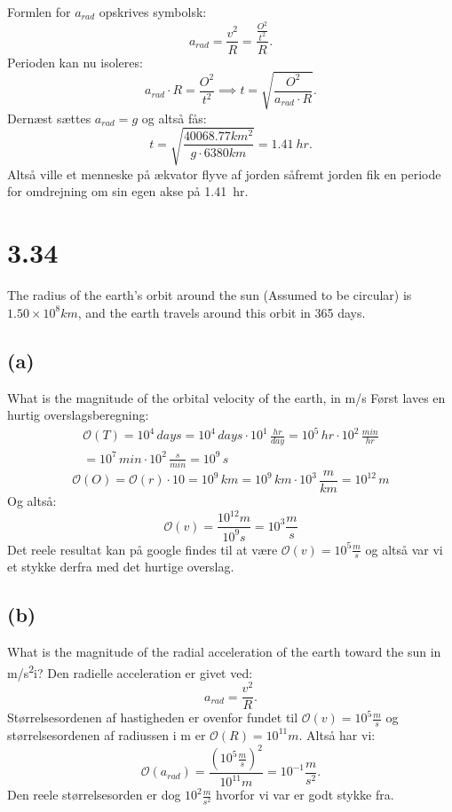 \documentclass[12pt]{article}
\begin{document}
\bigbreak
Formlen for $a_{rad}$ opskrives symbolsk:
\[
	a_{rad} = \frac{v^2}{R} = \frac{\frac{O^2}{t^2}}{R}
.\] 
Perioden kan nu isoleres:
\[
a_{rad}\cdot R = \frac{O^2}{t^2} \implies t = \sqrt{\frac{O^2}{a_{rad}\cdot R}} 
.\] 
Dernæst sættes $a_{rad} = g$ og altså fås:
\[
t = \sqrt{\frac{40068.77 km ^2}{g\cdot 6380 km}} = \qty{1,41}{hr}
.\] 
Altså ville et menneske på ækvator flyve af jorden såfremt jorden fik en periode for omdrejning om sin egen akse på \qty{1,41}{hr}.


\section*{3.34}
	The radius of the earth's orbit around the sun (Assumed to be circular) is $1.50 \times 10^8 \si{ km}$, and the earth travels around this orbit in 365 days.

	\subsection*{(a)}
	What is the magnitude of the orbital velocity of the earth, in \si{m/s}
	\bigbreak
	Først laves en hurtig overslagsberegning:
	\begin{gather*}
		\mathcal{O}(T) = 10^4 \,days = 10^4 \,days \cdot 10^1 \,\frac{hr}{day} =  10^5 \,hr \cdot 10^2 \,\frac{min}{hr} \\
		= 10^7 \,min \cdot 10^2 \,\frac{s}{min} = 10^9 \,s 
	\end{gather*}	
	\[
		\mathcal{O}(O) = \mathcal{O}(r) \cdot 10 = 10^9 \,km = 10^9 \,km \cdot 10^3 \,\frac{m}{km} = 10^{12} \,m
	\] 
	Og altså:
	\[
		\mathcal{O}(v) = \frac{10^{12} m}{10^9 s} = 10^3 \frac{m}{s}
	\]
	Det reele resultat kan på google findes til at være $\mathcal{O}(v) = 10^5 \frac{m}{s}$ og altså var vi et stykke derfra med det hurtige overslag.

	\subsection*{(b)}
	What is the magnitude of the radial acceleration of the earth toward the sun in \si{m/s^2}i?
	\bigbreak
	Den radielle acceleration er givet ved:
	\[
	a_{rad}=\frac{v^2}{R}
	.\] 
	Størrelsesordenen af hastigheden er ovenfor fundet til $\mathcal{O}(v) = 10^5 \frac{m}{s}$ og størrelsesordenen af radiussen i m er $\mathcal{O}(R) = 10^{11} m$. Altså har vi:
	\[
		\mathcal{O}(a_{rad}) = \frac{(10^5 \frac{m}{s})^2}{10^{11} m} = 10^{-1} \frac{m}{s^2}
	.\] 
	Den reele størrelsesorden er dog $10^2 \frac{m}{s^2}$ hvorfor vi var er godt stykke fra.
\end{document}
